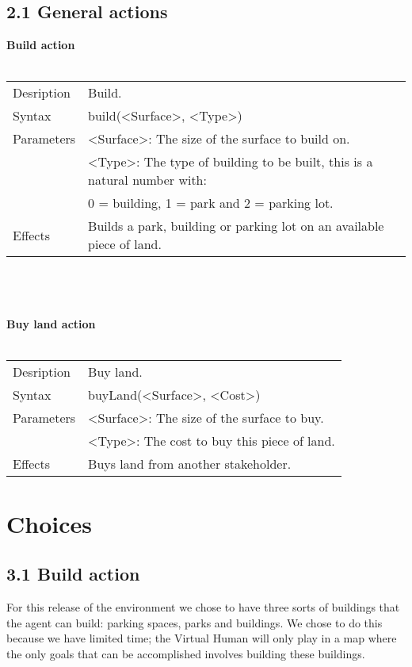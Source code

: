 \documentclass[english,11pt]{report}
\begin{document}
\newpage
\section*{2.1 General actions}

\textbf{Build action}\\
\\
\begin{tabularx}{\textwidth}{lX}
 Desription & Build. \\
 Syntax & build(<Surface>, <Type>) \\
 Parameters & <Surface>: The size of the surface to build on.\\
            & <Type>: The type of building to be built, this is a natural number with: \\
            &      0 = building, 1 = park and 2 = parking lot.\\
 Effects &  Builds a park, building or parking lot on an available piece of land.
\end{tabularx}\\
\\
\\
\textbf{Buy land action}\\
\\
\begin{tabularx}{\textwidth}{lX}
 Desription & Buy land. \\
 Syntax & buyLand(<Surface>, <Cost>) \\
 Parameters & <Surface>: The size of the surface to buy.\\
            & <Type>: The cost to buy this piece of land.\\
 Effects &  Buys land from another stakeholder.
\end{tabularx}

\chapter{Choices}

\section*{3.1 Build action}
For this release of the environment we chose to have three sorts of buildings that the agent can build: parking spaces, parks and buildings. We chose to do this because we have limited time; the Virtual Human will only play in a map where the only goals that can be accomplished involves building these buildings.
\end{document}
